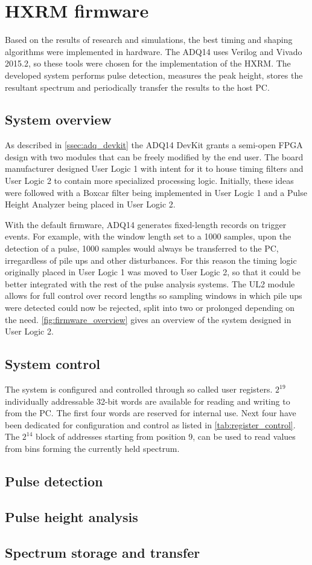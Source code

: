 \section{HXRM firmware}

Based on the results of research and simulations, the best timing
and shaping algorithms were implemented in hardware.
The ADQ14 uses Verilog and Vivado 2015.2, so these tools
were chosen for the implementation of the HXRM.
The developed system performs pulse detection,
measures the peak height, stores the resultant spectrum
and periodically transfer the results to the host PC.

\subsection{System overview}

As described in \autoref{ssec:adq_devkit} the ADQ14 DevKit
grants a semi-open FPGA design with two modules that can be
freely modified by the end user. The board manufacturer
designed User Logic 1 with intent for it to house timing filters
and User Logic 2 to contain more specialized processing logic.
Initially, these ideas were followed with a Boxcar filter being
implemented in User Logic 1 and a Pulse Height Analyzer being placed 
in User Logic 2.


With the default firmware, ADQ14 generates fixed-length records
on trigger events. For example, with the window length set to a 1000
samples, upon the detection of a pulse, 1000 samples would always be
transferred to the PC, irregardless of pile ups and other disturbances.
For this reason the timing logic originally placed in User Logic 1 was moved
to User Logic 2, so that it could be better integrated with the rest 
of the pulse analysis systems. The UL2 module allows for full control 
over record lengths so sampling windows in which pile ups were detected
could now be rejected, split into two or prolonged depending on the need.
\autoref{fig:firmware_overview} gives an overview of the system designed
in User Logic 2.

\subsection{System control}

The system is configured and controlled through so called 
user registers. $2^19$ individually addressable 32-bit words
are available for reading and writing to from the PC. The first
four words are reserved for internal use. Next four have been 
dedicated for configuration and control as listed in \autoref{tab:register_control}.
The $2^14$ block of addresses starting from position 9, can
be used to read values from bins forming the currently held spectrum.

\subsection{Pulse detection}
\subsection{Pulse height analysis}
\subsection{Spectrum storage and transfer}
